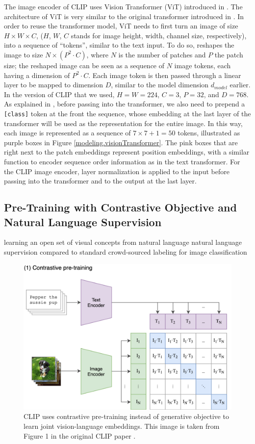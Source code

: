 The image encoder of CLIP uses Vision Transformer (ViT) introduced in \cite{ViT}. The architecture of ViT is very similar to the original transformer introduced in \cite{attentionAllYouNeed}. 
In order to reuse the transformer model, ViT needs to first turn an image of size $H\times W \times C$, ($H$, $W$, $C$ stands for image height, width, channel size, respectively), into a sequence of ``tokens'', similar to the text input.  
To do so, \cite{ViT} reshapes the image to size $N \times (P^2 \cdot C)$, where $N$ is the number of patches and $P$ the patch size; the reshaped image can be seen as a sequence of $N$ image tokens, each having a dimension of $P^2 \cdot C$. Each image token is then passed through a linear layer to be mapped to dimension $D$, similar to the model dimension $d_{model}$ earlier. 
In the version of CLIP that we used, $H = W = 224$, $C = 3$, $P = 32$, and $D = 768$. 
As explained in \cite{ViT}, before passing into the transformer, we also need to prepend a \texttt{[class]} token at the front the sequence, whose embedding at the last layer of the transformer will be used as the representation for the entire image. In this way, each image is represented as a sequence of $7\times 7 + 1 = 50$ tokens, illustrated as purple boxes in Figure \ref{modeling.visionTransformer}. The pink boxes that are right next to the patch embeddings represent position embeddings, with a similar function to encoder sequence order information as in the text transformer. 
For the CLIP image encoder, layer normalization is applied to the input before passing into the transformer and to the output at the last layer.



\subsection{Pre-Training with Contrastive Objective and Natural Language Supervision}
learning an open set of visual concepts from natural language natural language supervision compared to standard crowd-sourced labeling for image classification

\begin{figure}[!htb]
\includegraphics[width=0.7\linewidth]{modeling/CLIP.png}  
\caption{CLIP uses contrastive pre-training instead of generative objective to learn joint vision-language embeddings. This image is taken from Figure 1 in the original CLIP paper \citep{CLIPpaper}.}
\label{modeling.clip.pretrainingobj}
\end{figure}

